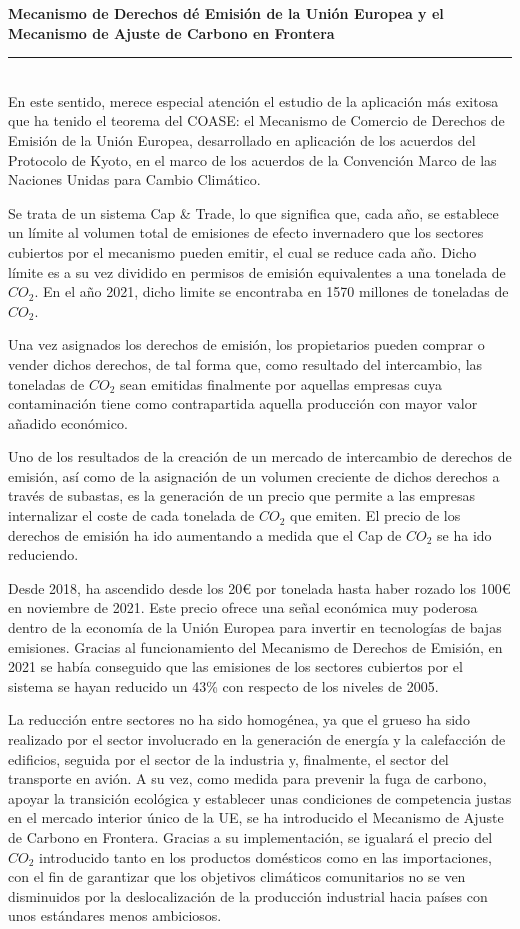 \documentclass[10pt,a4paper]{article}
\newenvironment{specialblock}[1]{%
      \begin{list}{}{%
          \setlength\leftmargin{1em}
          \setlength\rightmargin{1em}
      }
      \item[]
      \small
      \noindent\textbf{#1}\\[-0.3em]
      \rule{\linewidth}{0.4pt}\\[0.6em]
    }{%
      \end{list}
    }
\newcommand{\authorfont}[1]{{\fontfamily{EBGaramond-TLF}\selectfont #1}}
\begin{document}
\begin{specialblock}{Mecanismo de Derechos dé Emisión de la Unión Europea y el Mecanismo de Ajuste de Carbono en Frontera}
    En este sentido, merece especial atención el estudio de la aplicación más exitosa que ha tenido el teorema del \authorfont{COASE}: el Mecanismo de Comercio de Derechos de Emisión de la Unión Europea, desarrollado en aplicación de los acuerdos del Protocolo de Kyoto, en el marco de los acuerdos de la Convención Marco de las Naciones Unidas para Cambio Climático. 

    Se trata de un sistema Cap \& Trade, lo que significa que, cada año, se establece un límite al volumen total de emisiones de efecto invernadero que los sectores cubiertos por el mecanismo pueden emitir, el cual se reduce cada año. Dicho límite es a su vez dividido en permisos de emisión equivalentes a una tonelada de $CO_2$. En el año 2021, dicho limite se encontraba en 1570 millones de toneladas de $CO_2$. 
    
    Una vez asignados los derechos de emisión, los propietarios pueden comprar o vender dichos derechos, de tal forma que, como resultado del intercambio, las toneladas de $CO_2$ sean emitidas finalmente por aquellas empresas cuya contaminación tiene como contrapartida aquella producción con mayor valor añadido económico. 
    
    Uno de los resultados de la creación de un mercado de intercambio de derechos de emisión, así como de la asignación de un volumen creciente de dichos derechos a través de subastas, es la generación de un precio que permite a las empresas internalizar el coste de cada tonelada de $CO_2$ que emiten. El precio de los derechos de emisión ha ido aumentando a medida que el Cap de $CO_2$ se ha ido reduciendo. 
    
    Desde 2018, ha ascendido desde los 20€ por tonelada hasta haber rozado los 100€ en noviembre de 2021. Este precio ofrece una señal económica muy poderosa dentro de la economía de la Unión Europea para invertir en tecnologías de bajas emisiones. Gracias al funcionamiento del Mecanismo de Derechos de Emisión, en 2021 se había conseguido que las emisiones de los sectores cubiertos por el sistema se hayan reducido un 43\% con respecto de los niveles de 2005. 
    
    La reducción entre sectores no ha sido homogénea, ya que el grueso ha sido realizado por el sector involucrado en la generación de energía y la calefacción de edificios, seguida por el sector de la industria y, finalmente, el sector del transporte en avión. A su vez, como medida para prevenir la fuga de carbono, apoyar la transición ecológica y establecer unas condiciones de competencia justas en el mercado interior único de la UE, se ha introducido el Mecanismo de Ajuste de Carbono en Frontera. Gracias a su implementación, se igualará el precio del $CO_2$ introducido tanto en los productos domésticos como en las importaciones, con el fin de garantizar que los objetivos climáticos comunitarios no se ven disminuidos por la deslocalización de la producción industrial hacia países con unos estándares menos ambiciosos. 
    

\end{specialblock}
\end{document}
